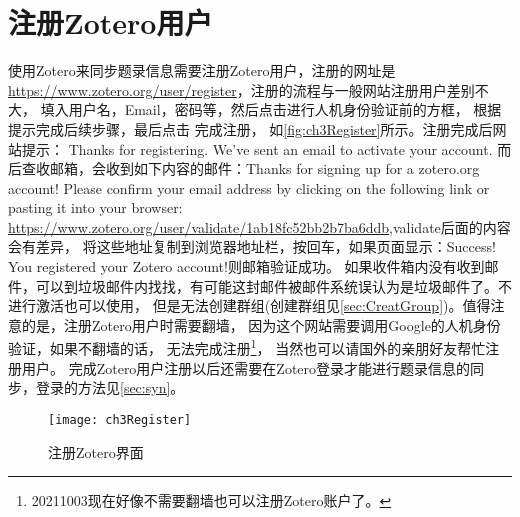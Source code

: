 \documentclass[theorem=false,mathfont=none,openany,sub3section]{easybook}
\begin{document}
\section{注册Zotero用户}\label{sec:zotReg}
使用Zotero来同步题录信息需要注册Zotero用户，注册的网址是\url{https://www.zotero.org/user/register}，注册的流程与一般网站注册用户差别不大，
填入用户名，Email，密码等，然后点击进行人机身份验证前的方框，
根据提示完成后续步骤，最后点击 完成注册，
如\autoref{fig:ch3Register}所示。注册完成后网站提示：
Thanks for registering. We’ve sent an email to activate your account.
而后查收邮箱，会收到如下内容的邮件：Thanks for signing up for a zotero.org account! Please confirm your email address 
by clicking on the following link or pasting it into your browser: 
\url{https://www.zotero.org/user/validate/1ab18fc52bb2b7ba6ddb},validate后面的内容会有差异，
将这些地址复制到浏览器地址栏，按回车，如果页面显示：Success! You registered your Zotero account!则邮箱验证成功。
如果收件箱内没有收到邮件，可以到垃圾邮件内找找，有可能这封邮件被邮件系统误认为是垃圾邮件了。不进行激活也可以使用，
但是无法创建群组(创建群组见\cref{sec:CreatGroup})。值得注意的是，注册Zotero用户时需要翻墙，
因为这个网站需要调用Google的人机身份验证，如果不翻墙的话，
无法完成注册\footnote{20211003现在好像不需要翻墙也可以注册Zotero账户了。}，
当然也可以请国外的亲朋好友帮忙注册用户。
完成Zotero用户注册以后还需要在Zotero登录才能进行题录信息的同步，登录的方法见\cref{sec:syn}。
\begin{figure}[htbp]
	\centering
	\texttt{[image: ch3Register]}
	\caption{注册Zotero界面}
	\label{fig:ch3Register}
\end{figure}
\end{document}

